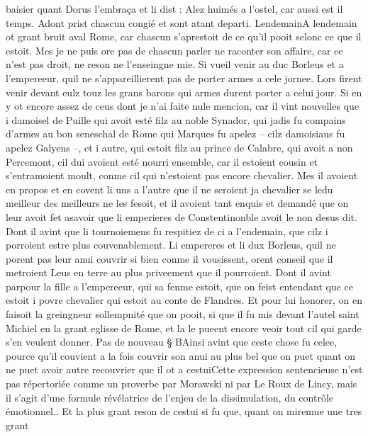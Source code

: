 \documentclass{article}
\begin{document}
\begin{pages}
   baisier quant Dorus l’embraça et li dist :
   Alez huimés a l’ostel, car aussi est il temps.
   Adont prist chascun congié et sont atant departi. \pend
\pstart LendemainA lendemain ot grant bruit aval 
   Rome, car chascun s’aprestoit de ce qu’il pooit selonc ce que il estoit.
   Mes je ne puis ore pas de chascun parler ne raconter son affaire, 
      car ce n’est pas droit, ne reson ne l’enseingne mie. 
      Si vueil venir au duc Borleus et a l’empereeur, 
   quil ne s’appareillierent pas de porter armes a cele jornee. Lors firent venir devant eulz touz les grans barons
   qui armes durent porter a celui jour. Si en y ot encore assez de ceus 
   dont je n’ai faite nule mencion,
   car il vint nouvelles que i damoisel de Puille
   qui avoit esté filz au noble Synador, qui jadis fu compains d’armes au
   bon seneschal de Rome qui Marques fu apelez
   – cilz damoisiaus fu apelez Galyens –, et i autre, qui estoit
   filz au prince de Calabre, qui avoit a non Percemont,
   cil dui avoient esté nourri ensemble, car il estoient cousin et s’entramoient moult, conme cil qui n’estoient pas encore chevalier. 
   Mes il avoient en propos et en covent li uns a l’autre
   que il ne seroient ja chevalier se ledu meilleur des meilleurs 
   ne les fesoit,
   et il avoient tant enquis et demandé que on leur avoit fet asavoir que
   li emperieres de Constentinonble
   avoit le non desus dit. Dont il avint que li tournoiemens fu respitiez de ci a l’endemain,
   que cilz i porroient estre plus couvenablement. \pend
\pstart Li empereres et li dux
   Borleus, quil ne porent pas leur anui couvrir si bien conme il vousissent,
   orent conseil que il metroient Leus en terre au plus priveement que il pourroient.
   Dont il avint parpour 
   la fille a l’empereeur,
      qui sa fenme estoit, que on feist entendant que ce estoit i povre chevalier qui estoit
   au conte de Flandres.
   Et pour lui honorer, on en faisoit la greingneur sollempnité que on pooit,
   si que il fu mis devant l’autel saint Michiel 
   en la grant eglisse de Rome,
   et la le pueent encore veoir tout cil qui garde s’en veulent donner. \pend
\pstart Pas de nouveau § BAinsi avint que ceste chose fu celee,
   pource qu’il couvient a la fois couvrir son anui au plus bel que on puet
      quant on ne puet avoir autre recouvrier que il ot a cestuiCette expression sentencieuse n'est 
      pas répertoriée comme un proverbe par Morawski ni par Le Roux de Lincy, mais il s'agit d'une formule révélatrice de l'enjeu de
      la dissimulation, du contrôle émotionnel..
   Et la plus grant reson de cestui si fu que, quant on miremue une tres grant 

\end{pages}
\end{document}
